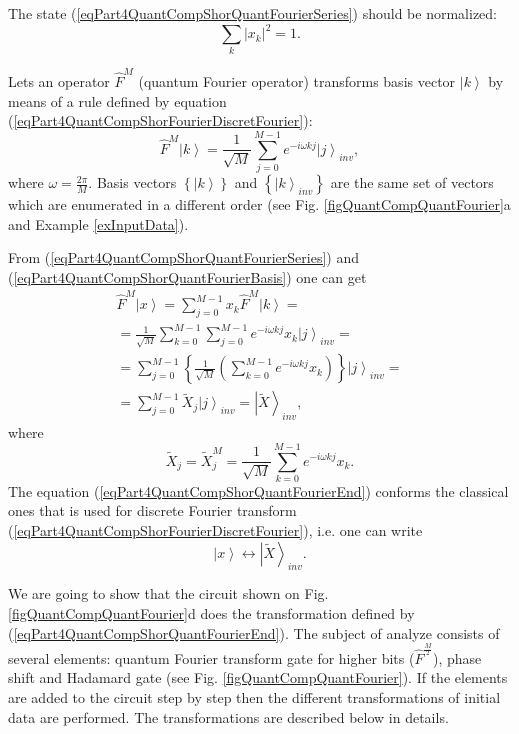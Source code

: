\documentclass{llncs}
\begin{document}
The state (\ref{eqPart4QuantCompShorQuantFourierSeries})
should be normalized:
\[
\sum_k\left|x_k\right|^2 = 1.
\]

Lets an operator $\hat{F}^{M}$ (quantum Fourier operator) transforms
basis vector  $\left|k\right>$ by means of a rule defined by equation 
(\ref{eqPart4QuantCompShorFourierDiscretFourier}):
\begin{equation}
\hat{F}^{M}\left|k\right> = \frac{1}{\sqrt{M}}\sum_{j = 0}^{M -1}
e^{-i \omega k j}\left|j\right>_{inv}, 
\label{eqPart4QuantCompShorQuantFourierBasis}
\end{equation}
where $\omega = \frac{2 \pi}{M}$.
Basis vectors $\left\{\left|k\right>\right\}$ and
$\left\{\left|k\right>_{inv}\right\}$ are the same set of vectors
which are enumerated in a different order
(see Fig. \ref{figQuantCompQuantFourier}a and Example
\ref{exInputData}). 

From (\ref{eqPart4QuantCompShorQuantFourierSeries}) and
(\ref{eqPart4QuantCompShorQuantFourierBasis}) one can get
\begin{eqnarray}
\hat{F}^{M}\left|x\right> = \sum_{j = 0}^{M - 1}x_k \hat{F}^{M}
\left|k\right> = 
\nonumber \\
= \frac{1}{\sqrt{M}}\sum_{k = 0}^{M -1}\sum_{j = 0}^{M - 1}
e^{-i \omega k j}x_k\left|j\right>_{inv} = 
\nonumber \\
= \sum_{j = 0}^{M - 1} \left\{\frac{1}{\sqrt{M}}\left(
\sum_{k = 0}^{M - 1}e^{-i \omega k j} x_k
\right)\right\}\left|j\right>_{inv} = 
\nonumber \\
= \sum_{j = 0}^{M - 1}\tilde{X}_j\left|j\right>_{inv} = \left|\tilde{X}\right>_{inv},
\label{eqPart4QuantCompShorQuantFourierEnd1}
\end{eqnarray}
where
\begin{equation}
\tilde{X}_j = \tilde{X}_j^{M} = 
\frac{1}{\sqrt{M}}\sum_{k = 0}^{M - 1}e^{-i \omega k j} x_k.
\label{eqPart4QuantCompShorQuantFourierEnd}
\end{equation}
The equation (\ref{eqPart4QuantCompShorQuantFourierEnd}) conforms the
classical ones that is used for discrete Fourier transform
(\ref{eqPart4QuantCompShorFourierDiscretFourier}), i.e. one can write
\[
 \left|x\right> \longleftrightarrow \left|\tilde{X}\right>_{inv}.
\]

We are going to show that the circuit shown on
Fig. \ref{figQuantCompQuantFourier}d does the transformation
defined by (\ref{eqPart4QuantCompShorQuantFourierEnd}). The subject of
analyze consists of several elements: quantum Fourier transform gate for higher
bits ($\hat{F}^{\frac{M}{2}}$), phase shift and Hadamard
gate (see Fig. \ref{figQuantCompQuantFourier}). If the elements
are added to the circuit step by step then the different
transformations of initial data are performed. The transformations are
described below in details.
\end{document}

